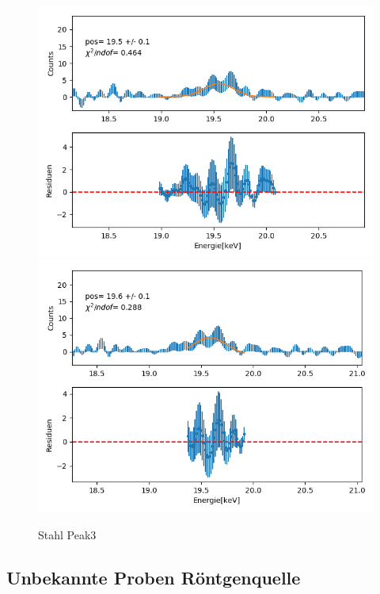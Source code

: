 \documentclass[12pt,a4paper]{article}
\begin{document}
\begin{figure}[H]
\centering
\includegraphics[scale=0.49]{Bilder/alpha_spektren/stahl_3_1.png}
\includegraphics[scale=0.49]{Bilder/alpha_spektren/stahl_3_2.png}
\caption{Stahl Peak3}
\end{figure}
\subsection{Unbekannte Proben Röntgenquelle}
\end{document}
